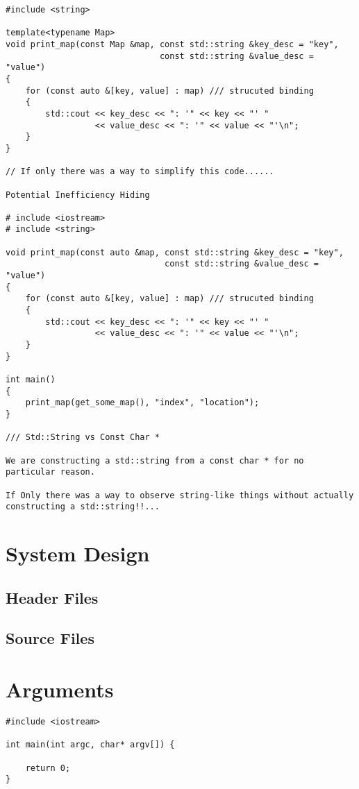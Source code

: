 \begin{verbatim}
#include <string>

template<typename Map>
void print_map(const Map &map, const std::string &key_desc = "key",
                               const std::string &value_desc = "value")
{
    for (const auto &[key, value] : map) /// strucuted binding
    {
        std::cout << key_desc << ": '" << key << "' "
                  << value_desc << ": '" << value << "'\n";
    }
}

// If only there was a way to simplify this code......

Potential Inefficiency Hiding

# include <iostream>
# include <string>

void print_map(const auto &map, const std::string &key_desc = "key",
                                const std::string &value_desc = "value")
{
    for (const auto &[key, value] : map) /// strucuted binding
    {
        std::cout << key_desc << ": '" << key << "' "
                  << value_desc << ": '" << value << "'\n";
    }
}

int main()
{
    print_map(get_some_map(), "index", "location");
}

/// Std::String vs Const Char *

We are constructing a std::string from a const char * for no particular reason.

If Only there was a way to observe string-like things without actually constructing a std::string!!...
\end{verbatim}

\section{System Design}

\subsection{Header Files}

\subsection{Source Files}

\section{Arguments}

\begin{verbatim}
#include <iostream>

int main(int argc, char* argv[]) {

    return 0;
}
\end{verbatim}

